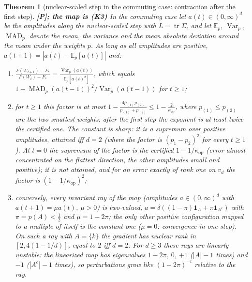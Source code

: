 \documentclass[11pt]{article}
\newtheorem{theorem}{Theorem}[section]
\theoremstyle{definition}
\theoremstyle{remark}
\newcommand{\E}{\mathbb{E}}
\newcommand{\abs}[1]{\left|#1\right|}
\newcommand{\tr}{\operatorname{tr}}
\newcommand{\Var}{\operatorname{Var}}
\newcommand{\MAD}{\operatorname{MAD}}
\newcommand{\kop}{\kappa_{\mathrm{op}}}
\newcommand{\ones}{\mathbf{1}}
\begin{document}
\begin{theorem}[nuclear-scaled step in the commuting case: contraction after the first step]\label{thm:mad}
\textbf{[P]; the map is (K3)}
In the commuting case let $a(t)\in(0,\infty)^d$ be the amplitudes along the nuclear-scaled step with $L=\tr\Sigma$, and
let $\E_p$, $\Var_p$, $\MAD_p$ denote the mean, the variance and the mean absolute deviation around the mean under the
weights $p$. As long as all amplitudes are positive, $a(t+1)=\abs{a(t)-\E_p[a(t)]}$ and:
\begin{enumerate}[label=(\alph*)]
\item $\displaystyle\frac{F(W_{t+1})-F_\ast}{F(W_t)-F_\ast}=\frac{\Var_p(a(t))}{\E_p[a(t)^2]}$, which equals
$1-\MAD_p(a(t-1))^2/\Var_p(a(t-1))$ for $t\ge1$;
\item for $t\ge1$ this factor is at most $1-\frac{4p_{(1)}p_{(2)}}{p_{(1)}+p_{(2)}}\le1-\frac2{\kop}$, where
$p_{(1)}\le p_{(2)}$ are the two smallest weights: after the first step the exponent is at least twice the certified
one. The constant is sharp: it is a supremum over positive amplitudes, attained iff $d=2$ (where the factor is
$(p_1-p_2)^2$ for every $t\ge1$). At $t=0$ the supremum of the factor is the certified $1-1/\kop$ (error almost
concentrated on the flattest direction, the other amplitudes small and positive); it is not attained, and for an error
exactly of rank one on $v_d$ the factor is $(1-1/\kop)^2$;
\item conversely, every invariant ray of the map (amplitudes $a\in(0,\infty)^d$ with $a(t+1)=\mu a(t)$, $\mu>0$) is
two-valued, $a=\delta((1-\pi)\ones_A+\pi\ones_{A^c})$ with $\pi=p(A)<\frac12$ and $\mu=1-2\pi$; the only other
positive configuration mapped to a multiple of itself is the constant one ($\mu=0$: convergence in one step). On such a
ray with $A=\{k\}$ the gradient has nuclear rank in $[2,4(1-1/d)]$, equal to $2$ iff $d=2$. For $d\ge3$ these rays are
linearly unstable: the linearized map has eigenvalues $1-2\pi$, $0$, $+1$ ($\abs A-1$ times) and $-1$
($\abs{A^c}-1$ times), so perturbations grow like $(1-2\pi)^{-t}$ relative to the ray.
\end{enumerate}
\end{theorem}
\end{document}
